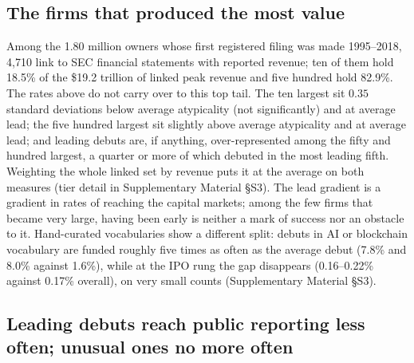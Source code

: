 \subsection{The firms that produced the most value}\label{sec:value}

Among the 1.80 million owners whose first registered filing was made
1995--2018, 4{,}710 link to SEC financial statements with reported
revenue; ten of them hold 18.5\% of the \$19.2 trillion of linked peak
revenue and five hundred hold 82.9\%. The rates above do not carry over
to this top tail. The ten largest sit $0.35$ standard deviations below
average atypicality (not significantly) and at average lead; the five
hundred largest sit slightly above average atypicality and at average
lead; and leading debuts are, if anything, over-represented among the
fifty and hundred largest, a quarter or more of which debuted in the
most leading fifth. Weighting the whole linked set by revenue puts it at
the average on both measures (tier detail in Supplementary Material \S S3).
The lead gradient is a gradient in rates of reaching the capital
markets; among the few firms that became very large, having been early
is neither a mark of success nor an obstacle to it. Hand-curated
vocabularies show a different split: debuts in AI or blockchain
vocabulary are funded roughly five times as often as the average debut
(7.8\% and 8.0\% against 1.6\%), while at the IPO rung the gap
disappears (0.16--0.22\% against 0.17\% overall), on very small counts
(Supplementary Material \S S3).

\subsection{Leading debuts reach public reporting less often; unusual ones no more often}\label{sec:bluesea}

